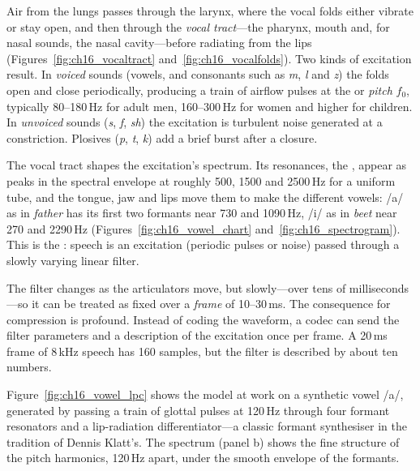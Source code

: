 Air from the lungs passes through the larynx, where the vocal folds either vibrate or stay open,
and then through the \emph{vocal tract}---the pharynx, mouth and, for nasal sounds, the nasal
cavity---before radiating from the lips (Figures~\ref{fig:ch16_vocaltract} and~\ref{fig:ch16_vocalfolds}). Two kinds of excitation
result. In \emph{voiced} sounds (vowels, and consonants such as \emph{m}, \emph{l} and \emph{z})
the folds open and close periodically, producing a train of airflow pulses at the
 or \emph{pitch} $f_0$, typically 80--180\,Hz for adult men,
160--300\,Hz for women and higher for children. In \emph{unvoiced} sounds (\emph{s}, \emph{f},
\emph{sh}) the excitation is turbulent noise generated at a constriction. Plosives (\emph{p},
\emph{t}, \emph{k}) add a brief burst after a closure.

The vocal tract shapes the excitation's spectrum. Its resonances, the , appear as
peaks in the spectral envelope at roughly 500, 1500 and 2500\,Hz for a uniform tube, and the
tongue, jaw and lips move them to make the different vowels: /a/ as in \emph{father} has its
first two formants near 730 and 1090\,Hz, /i/ as in \emph{beet} near 270 and 2290\,Hz
(Figures~\ref{fig:ch16_vowel_chart} and~\ref{fig:ch16_spectrogram}). This is the : speech is an
excitation (periodic pulses or noise) passed through a slowly varying linear filter.


The filter changes as the articulators move, but slowly---over tens of milliseconds---so it can be
treated as fixed over a \emph{frame} of 10--30\,ms. The consequence for compression is profound.
Instead of coding the waveform, a codec can send the filter parameters and a description of the
excitation once per frame. A 20\,ms frame of 8\,kHz speech has 160 samples, but the filter is
described by about ten numbers.

Figure~\ref{fig:ch16_vowel_lpc} shows the model at work on a synthetic vowel /a/, generated by
passing a train of glottal pulses at 120\,Hz through four formant resonators and a lip-radiation
differentiator---a classic formant synthesiser in the tradition of Dennis Klatt's. The spectrum
(panel b) shows the fine structure of the pitch harmonics, 120\,Hz apart, under the smooth envelope
of the formants.

